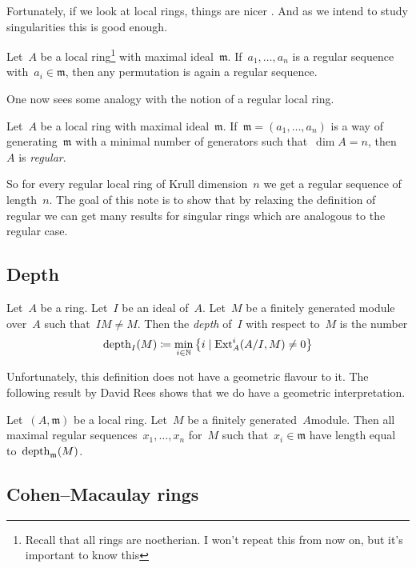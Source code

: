\documentclass[10pt,a4paper]{article}
\begin{document}
Fortunately, if we look at local rings, things are nicer \cite[corollary 17.2]{eisenbud-commutative-algebra}. And as we intend to study singularities this is good enough.
\begin{corollary}
  Let~$A$ be a local ring\footnote{Recall that all rings are noetherian. I won't repeat this from now on, but it's important to know this} with maximal ideal~$\mathfrak{m}$. If~$a_1,\dotsc,a_n$ is a regular sequence with~$a_i\in\mathfrak{m}$, then any permutation is again a regular sequence.
\end{corollary}
One now sees some analogy with the notion of a regular local ring.
\begin{definition}
  Let~$A$ be a local ring with maximal ideal~$\mathfrak{m}$. If~$\mathfrak{m}=(a_1,\dotsc,a_n)$ is a way of generating~$\mathfrak{m}$ with a minimal number of generators such that~$\dim A=n$, then~$A$ is \emph{regular}.
\end{definition}
So for every regular local ring of Krull dimension~$n$ we get a regular sequence of length~$n$. The goal of this note is to show that by relaxing the definition of regular we can get many results for singular rings which are analogous to the regular case.

\subsection{Depth}
\begin{definition}
  Let~$A$ be a ring. Let~$I$ be an ideal of~$A$. Let~$M$ be a finitely generated module over~$A$ such that~$IM\neq M$. Then the \emph{depth} of~$I$ with respect to~$M$ is the number
  \begin{equation}
    \operatorname{depth}_I(M)\coloneqq\min_{i\in\mathbb{N}}\left\{ i\mid\operatorname{Ext}_A^i(A/I,M)\neq 0 \right\}
  \end{equation}
\end{definition}
Unfortunately, this definition does not have a geometric flavour to it. The following result by David Rees shows that we do have a geometric interpretation.
\begin{theorem}
  Let~$(A,\mathfrak{m})$ be a local ring. Let~$M$ be a finitely generated~$A$\dash module. Then all maximal regular sequences~$x_1,\dotsc,x_n$ for~$M$ such that~$x_i\in\mathfrak{m}$ have length equal to~$\operatorname{depth}_{\mathfrak{m}}(M)$.
\end{theorem}


\subsection{Cohen--Macaulay rings}
\end{document}
